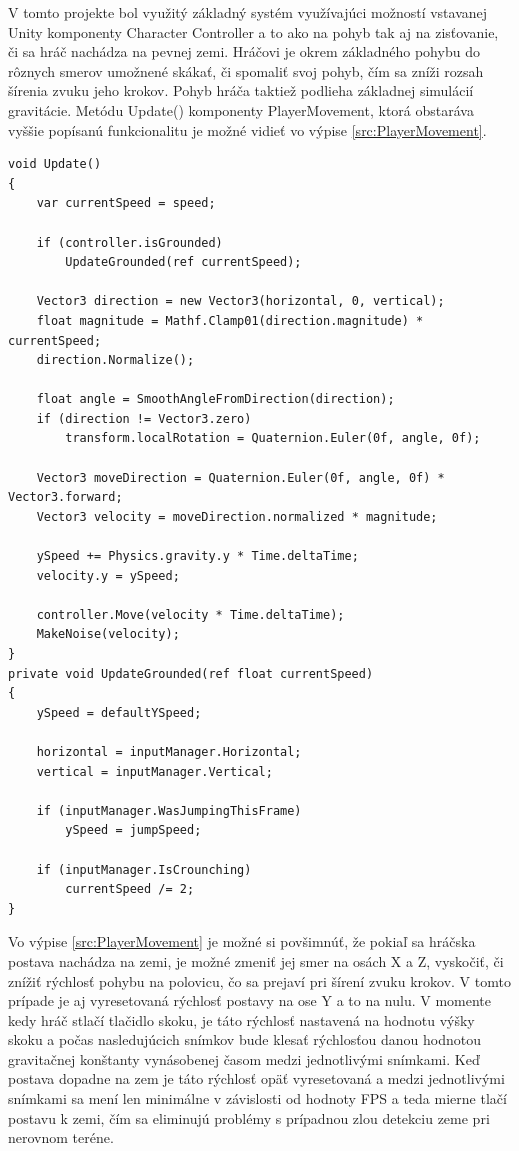 \documentclass[slovak, master]{diploma}
\begin{document}
V tomto projekte bol využitý základný systém využívajúci možností vstavanej Unity komponenty Character Controller a to ako na pohyb tak aj na zisťovanie, či sa hráč nachádza na pevnej zemi. Hráčovi je okrem základného pohybu do rôznych smerov umožnené skákať, či spomaliť svoj pohyb, čím sa zníži rozsah šírenia zvuku jeho krokov. Pohyb hráča taktiež podlieha základnej simulácií gravitácie. Metódu Update() komponenty PlayerMovement, ktorá obstaráva vyššie popísanú funkcionalitu je možné vidieť vo výpise \ref{src:PlayerMovement}.

\vspace{8pt}
\begin{lstlisting}[label=src:PlayerMovement,caption={Realizácia pohybu hráčskej postavy}]
void Update()
{
    var currentSpeed = speed;

    if (controller.isGrounded)
        UpdateGrounded(ref currentSpeed);

    Vector3 direction = new Vector3(horizontal, 0, vertical);
    float magnitude = Mathf.Clamp01(direction.magnitude) * currentSpeed;
    direction.Normalize();

    float angle = SmoothAngleFromDirection(direction);
    if (direction != Vector3.zero)
        transform.localRotation = Quaternion.Euler(0f, angle, 0f);

    Vector3 moveDirection = Quaternion.Euler(0f, angle, 0f) * Vector3.forward;
    Vector3 velocity = moveDirection.normalized * magnitude;

    ySpeed += Physics.gravity.y * Time.deltaTime;
    velocity.y = ySpeed;

    controller.Move(velocity * Time.deltaTime);
    MakeNoise(velocity);
}
private void UpdateGrounded(ref float currentSpeed)
{
    ySpeed = defaultYSpeed;

    horizontal = inputManager.Horizontal;
    vertical = inputManager.Vertical;

    if (inputManager.WasJumpingThisFrame)
        ySpeed = jumpSpeed;

    if (inputManager.IsCrounching)
        currentSpeed /= 2;
}
\end{lstlisting}

Vo výpise \ref{src:PlayerMovement} je možné si povšimnúť, že pokiaľ sa hráčska postava nachádza na zemi, je možné zmeniť jej smer na osách X a Z, vyskočiť, či znížiť rýchlosť pohybu na polovicu, čo sa prejaví pri šírení zvuku krokov. V tomto prípade je aj vyresetovaná rýchlosť postavy na ose Y a to na nulu. V momente kedy hráč stlačí tlačidlo skoku, je táto rýchlosť nastavená na hodnotu výšky skoku a počas nasledujúcich snímkov bude klesať rýchlosťou danou hodnotou gravitačnej konštanty vynásobenej časom medzi jednotlivými snímkami. Keď postava dopadne na zem je táto rýchlosť opäť vyresetovaná a medzi jednotlivými snímkami sa mení len minimálne v závislosti od hodnoty FPS a teda mierne tlačí postavu k zemi, čím sa eliminujú problémy s prípadnou zlou detekciu zeme pri nerovnom teréne.
\end{document}
